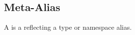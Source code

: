 \subsection{Meta-Alias}
\label{concept-Meta-Alias}

A  is a  reflecting a type or namespace alias.  




